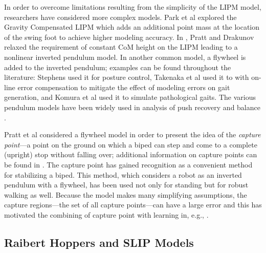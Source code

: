 In order to overcome limitations resulting from the simplicity of the LIPM
model, researchers have considered more complex models.
%
Park et al \cite{Park1998} explored the Gravity Compensated LIPM which adds an
additional point mass at the location of the swing foot to achieve higher
modeling accuracy.
%
In \cite{Pratt2007}, Pratt and Drakunov relaxed the requirement of constant CoM
height on the LIPM leading to a nonlinear inverted pendulum model.
%
In another common model, a flywheel is added to the inverted pendulum;
%
examples can be found throughout the literature:
%
Stephens \cite{Stephens2011} used it for posture control,
%
Takenaka et al \cite{Takenaka2009} used it to with on-line error compensation to
mitigate the effect of modeling errors on gait generation,
%
and Komura et al \cite{Komura2005} used it to simulate pathological gaits.
%
The various pendulum models have been widely used in analysis of push recovery
and balance \cite{Takanishi1990,Hof2005,Hyon2007,Stephens2007}.


%
Pratt et al \cite{Pratt2006} considered a flywheel model in order to present the
idea of the {\em capture point}---a point on the ground on which a biped can
step and come to a complete (upright) stop without falling over;
%
additional information on capture points can be found in
\cite{Koolen2012,Pratt2012}.
%
The capture point \cite{Pratt2006a} has gained recognition as a convenient
method for stabilizing a biped.
%
%
This method, which considers a robot as an inverted pendulum with a flywheel,
has been used not only for standing but for robust walking as well.
%
Because the model makes many simplifying assumptions, the capture regions---the
set of all capture points---can have a large error and this has motivated the
combining of capture point with learning in, e.g., \cite{Rebula2007}.

\subsection{Raibert Hoppers and SLIP Models}

